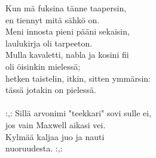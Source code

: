 
Kun mä fuksina tänne taapersin,  \\ en tiennyt mitä sähkö on.  \\ Meni innosta pieni pääni sekaisin,  \\ laulukirja oli tarpeeton.  \\ Mulla kavaletti, nabla ja kosini fii  \\ oli öisinkin mielessä;  \\ hetken taistelin, itkin, sitten ymmärsin:  \\ tässä jotakin on pielessä. \\ \hspace{10mm} \\ :,: Sillä arvonimi "teekkari" sovi sulle ei,  \\ jos vain Maxwell aikasi vei.  \\ Kylmää kaljaa juo ja nauti \\ nuoruudesta. :,:
